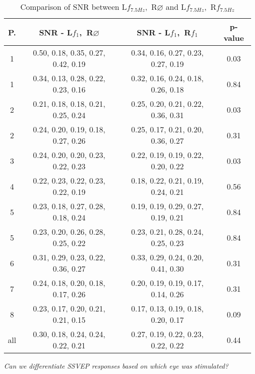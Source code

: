 \begin{table}[htbp]
  \centering
  \begin{tabularx}{\textwidth}{cccc}
      \hline      
      {\textbf{P.}} & {\textbf{SNR - L$f_{1}$,~R$\varnothing$}} & \textbf{SNR - L$f_{1}$,~R$f_{1}$} & \multicolumn{1}{c}{\textbf{p-value}}\\
      \hline
      1 & 0.50, 0.18, 0.35, 0.27, 0.42, 0.19 & 0.34, 0.16, 0.27, 0.23, 0.27, 0.19 &  0.03 \\
1 & 0.34, 0.13, 0.28, 0.22, 0.23, 0.16 & 0.32, 0.16, 0.24, 0.18, 0.26, 0.18 &  0.84 \\
2 & 0.21, 0.18, 0.18, 0.21, 0.25, 0.24 & 0.25, 0.20, 0.21, 0.22, 0.36, 0.31 &  0.03 \\
2 & 0.24, 0.20, 0.19, 0.18, 0.27, 0.26 & 0.25, 0.17, 0.21, 0.20, 0.36, 0.27 &  0.31 \\
3 & 0.24, 0.20, 0.20, 0.23, 0.22, 0.23 & 0.22, 0.19, 0.19, 0.22, 0.20, 0.22 &  0.03 \\
4 & 0.22, 0.23, 0.22, 0.23, 0.22, 0.19 & 0.18, 0.22, 0.21, 0.19, 0.24, 0.21 &  0.56 \\
5 & 0.23, 0.18, 0.27, 0.28, 0.18, 0.24 & 0.19, 0.19, 0.29, 0.27, 0.19, 0.21 &  0.84 \\
5 & 0.23, 0.20, 0.26, 0.28, 0.25, 0.22 & 0.23, 0.21, 0.28, 0.24, 0.25, 0.23 &  0.84 \\
6 & 0.31, 0.29, 0.23, 0.22, 0.36, 0.27 & 0.33, 0.29, 0.24, 0.20, 0.41, 0.30 &  0.31 \\
7 & 0.24, 0.18, 0.20, 0.18, 0.17, 0.26 & 0.20, 0.19, 0.19, 0.17, 0.14, 0.26 &  0.31 \\
8 & 0.23, 0.17, 0.20, 0.21, 0.21, 0.15 & 0.17, 0.13, 0.19, 0.18, 0.20, 0.17 &  0.09 \\
all & 0.30, 0.18, 0.24, 0.24, 0.22, 0.21 & 0.27, 0.19, 0.22, 0.23, 0.22, 0.22 & 0.44 \\
   \hline
  \end{tabularx}
  \caption{Comparison of SNR between L$f_{7.5 Hz}$,~R$\varnothing$ and L$f_{7.5 Hz}$,~R$f_{7.5 Hz}$}
  \emph{Can we differentiate SSVEP responses based on which eye was stimulated?}
  \label{tab:rq1c2}
\end{table}

